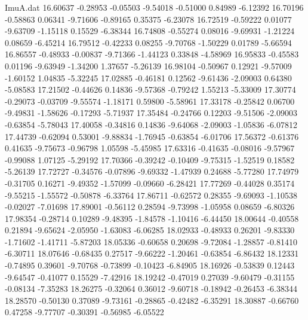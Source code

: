 \begin{filecontents}{ImuA.dat}
  16.60637   -0.28953   -0.05503   -9.54018   -0.51000    0.84989   -6.12392
  16.70196   -0.58863    0.06341   -9.71606   -0.89165    0.35375   -6.23078
  16.72519   -0.59222    0.01077   -9.63709   -1.15118    0.15529   -6.38344
  16.74808   -0.55274    0.08016   -9.69931   -1.21224    0.08659   -6.45214
  16.79512   -0.42233    0.08255   -9.70768   -1.50229    0.01789   -5.66594
  16.86557   -0.48933   -0.00837   -9.71366   -1.44123    0.33848   -4.58969
  16.95833   -0.45583    0.01196   -9.63949   -1.34200    1.37657   -5.26139
  16.98104   -0.50967    0.12921   -9.57009   -1.60152    1.04835   -5.32245
  17.02885   -0.46181    0.12562   -9.61436   -2.09003    0.64380   -5.08583
  17.21502   -0.44626    0.14836   -9.57368   -0.79242    1.55213   -5.33009
  17.30774   -0.29073   -0.03709   -9.55574   -1.18171    0.59800   -5.58961
  17.33178   -0.25842    0.06700   -9.49831   -1.58626   -0.17293   -5.71937
  17.35484   -0.24766    0.12203   -9.51506   -2.09003   -0.63854   -5.78043
  17.40058   -0.34816    0.14836   -9.64068   -2.09003   -1.05836   -6.07812
  17.44739   -0.62094    0.53001   -9.88834   -1.76945   -0.63854   -6.01706
  17.56372   -0.61376    0.41635   -9.75673   -0.96798    1.05598   -5.45985
  17.63316   -0.41635   -0.08016   -9.57967   -0.99088    1.07125   -5.29192
  17.70366   -0.39242   -0.10409   -9.75315   -1.52519    0.18582   -5.26139
  17.72727   -0.34576   -0.07896   -9.69332   -1.47939    0.24688   -5.77280
  17.74979   -0.31705    0.16271   -9.49352   -1.57099   -0.09660   -6.28421
  17.77269   -0.44028    0.35174   -9.55215   -1.55572   -0.50878   -6.33764
  17.86711   -0.62572    0.28355   -9.69093   -1.10538   -0.02027   -7.01698
  17.89001   -0.56112    0.28594   -9.73998   -1.05958    0.08659   -6.80326
  17.98354   -0.28714    0.10289   -9.48395   -1.84578   -1.10416   -6.44450
  18.00644   -0.40558    0.21894   -9.65624   -2.05950   -1.63083   -6.06285
  18.02933   -0.48933    0.26201   -9.83330   -1.71602   -1.41711   -5.87203
  18.05336   -0.60658    0.20698   -9.72084   -1.28857   -0.81410   -6.30711
  18.07646   -0.68435    0.27517   -9.66222   -1.20461   -0.63854   -6.86432
  18.12331   -0.74895    0.39601   -9.70768   -0.73899   -0.10423   -6.84905
  18.16926   -0.53839    0.12443   -9.64547   -0.41077    0.15529   -7.42916
  18.19242   -0.47019    0.27039   -9.60479   -0.31155   -0.08134   -7.35283
  18.26275   -0.32064    0.36012   -9.60718   -0.18942   -0.26453   -6.38344
  18.28570   -0.50130    0.37089   -9.73161   -0.28865   -0.42482   -6.35291
  18.30887   -0.66760    0.47258   -9.77707   -0.30391   -0.56985   -6.05522

\end{filecontents}
